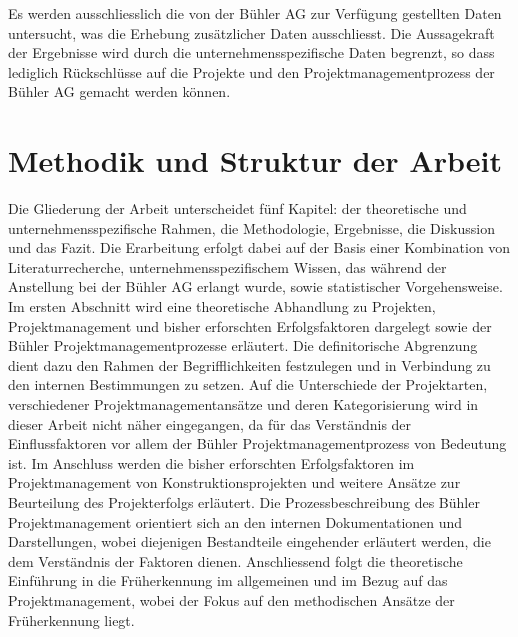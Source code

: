 \newline\newline
Es werden ausschliesslich die von der Bühler AG zur Verfügung gestellten Daten untersucht, was die Erhebung zusätzlicher Daten ausschliesst. Die Aussagekraft der Ergebnisse wird durch die unternehmensspezifische Daten begrenzt, so dass lediglich Rückschlüsse auf die Projekte und den Projektmanagementprozess der Bühler AG gemacht werden können.
\section{Methodik und Struktur der Arbeit}
Die Gliederung der Arbeit unterscheidet fünf Kapitel: der theoretische und unternehmensspezifische Rahmen, die Methodologie, Ergebnisse, die Diskussion und das Fazit. Die Erarbeitung erfolgt dabei auf der Basis einer Kombination von Literaturrecherche, unternehmensspezifischem Wissen, das während der Anstellung bei der Bühler AG erlangt wurde, sowie statistischer Vorgehensweise.
\newline\newline
Im ersten Abschnitt wird eine theoretische Abhandlung zu Projekten, Projektmanagement und bisher erforschten Erfolgsfaktoren dargelegt sowie der Bühler Projektmanagementprozesse erläutert. Die definitorische Abgrenzung dient dazu den Rahmen der Begrifflichkeiten festzulegen und in Verbindung zu den internen Bestimmungen zu setzen. Auf die Unterschiede der Projektarten, verschiedener Projektmanagementansätze und deren Kategorisierung wird in dieser Arbeit nicht näher eingegangen, da für das Verständnis der Einflussfaktoren vor allem der Bühler Projektmanagementprozess von Bedeutung ist. Im Anschluss werden die bisher erforschten Erfolgsfaktoren im Projektmanagement von Konstruktionsprojekten und weitere Ansätze zur Beurteilung des Projekterfolgs erläutert. Die Prozessbeschreibung des Bühler Projektmanagement orientiert sich an den internen Dokumentationen und Darstellungen, wobei diejenigen Bestandteile eingehender erläutert werden, die dem Verständnis der Faktoren dienen. Anschliessend folgt die theoretische Einführung in die Früherkennung im allgemeinen und im Bezug auf das Projektmanagement, wobei der Fokus auf den methodischen Ansätze der Früherkennung liegt.
